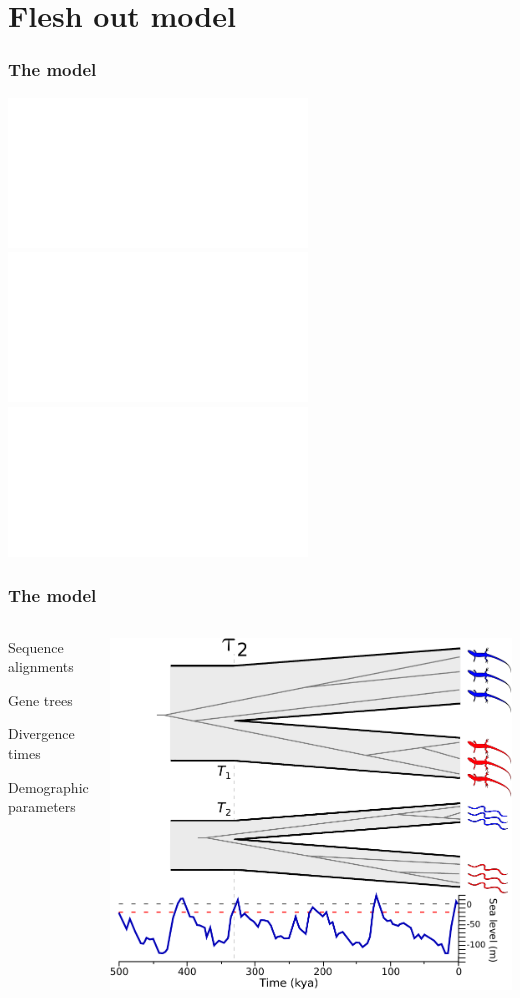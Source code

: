\section{Flesh out model}
\begin{frame}
    \frametitle{The \msb model}
    \centerline{
        \includegraphics<1>[width=\textwidth]{../images/sea-level-prediction-trees-labels.pdf}
        \includegraphics<2>[width=\textwidth]{../images/sea-level-species-trees-islands.pdf}
        \includegraphics<3>[width=\textwidth]{../images/sea-level-species-trees-gene-trees-islands.pdf}
    }
\end{frame}

\begin{frame}
    \frametitle{The \msb model}
    \begin{columns}[c]
            \begin{mydescription}
                \item<2->[\alignmentVector] Sequence alignments
                \item<2->[\geneTreeVector] Gene trees
                \item<2->[\divTimeMapVector] Divergence times
                \item<2->[\demographicParamVector] Demographic parameters
            \end{mydescription}
            \includegraphics[width=\textwidth]{../images/sea-level-species-trees-gene-trees.pdf}
    \end{columns}
\end{frame}


